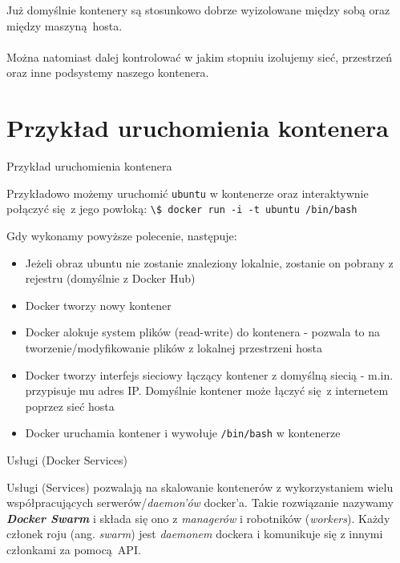 \documentclass[aspectratio=169]{beamer}
\begin{document}
\begin{frame}
    \begin{card}
        Już domyślnie kontenery są stosunkowo dobrze wyizolowane między sobą oraz między maszyną hosta.\\\\
        Można natomiast dalej kontrolować w jakim stopniu izolujemy sieć, przestrzeń oraz inne podsystemy naszego kontenera.
    \end{card}
\end{frame}

\section{Przykład uruchomienia kontenera}
\begin{frame}{Przykład uruchomienia kontenera}
    \begin{cardTiny}
        Przykładowo możemy uruchomić \colorbox{dark-gray}{\lstinline{ubuntu}} w kontenerze oraz interaktywnie połączyć się z jego powłoką: \colorbox{dark-gray}{\lstinline{\$ docker run -i -t ubuntu /bin/bash}}
    \end{cardTiny}

    \begin{cardTiny}
        Gdy wykonamy powyższe polecenie, następuje:
        \begin{itemize}
            \item Jeżeli obraz ubuntu nie zostanie znaleziony lokalnie, zostanie on pobrany z rejestru (domyślnie z Docker Hub)
            \item Docker tworzy nowy kontener
            \item Docker alokuje system plików (read-write) do kontenera - pozwala to na tworzenie/modyfikowanie plików z lokalnej przestrzeni hosta
            \item Docker tworzy interfejs sieciowy łączący kontener z domyślną siecią - m.in. przypisuje mu adres IP. Domyślnie kontener może łączyć się z internetem poprzez sieć hosta
            \item Docker uruchamia kontener i wywołuje \colorbox{dark-gray}{\lstinline{/bin/bash}} w kontenerze
        \end{itemize}
    \end{cardTiny}
\end{frame}

\begin{frame}{Usługi (Docker Services)}
    \begin{card}
        Usługi (Services) pozwalają na skalowanie kontenerów z wykorzystaniem wielu współpracujących serwerów/\textit{daemon'ów} docker'a.
        Takie rozwiązanie nazywamy \textbf{\textit{Docker Swarm}} i składa się ono z \textit{managerów} i robotników (\textit{workers}). 
        Każdy członek roju (ang. \textit{swarm}) jest \textit{daemonem} dockera i komunikuje się z innymi członkami za pomocą API.
    \end{card}
\end{frame}
\end{document}
